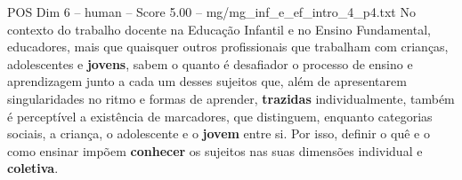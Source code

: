 \begin{textsample}{POS Dim 6 – human – Score 5.00 – mg/mg\_inf\_e\_ef\_intro\_4\_p4.txt}  \label{ex:f6_pos_002}
No contexto do trabalho docente na Educação Infantil e no Ensino Fundamental, educadores, mais que quaisquer outros profissionais que trabalham com crianças, adolescentes e \textbf{jovens}, sabem o quanto é desafiador o processo de ensino e aprendizagem junto a cada um desses sujeitos que, além de apresentarem singularidades no ritmo e formas de aprender, \textbf{trazidas} individualmente, também é perceptível a existência de marcadores, que distinguem, enquanto categorias sociais, a criança, o adolescente e o \textbf{jovem} entre si.
Por isso, definir o quê e o como ensinar impõem \textbf{conhecer} os sujeitos nas suas dimensões individual e \textbf{coletiva}.

\end{textsample}
